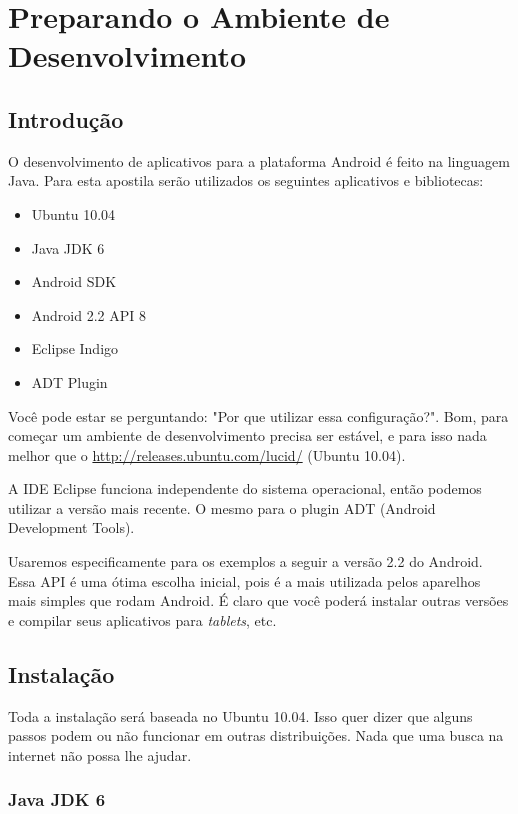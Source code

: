 \chapter{Preparando o Ambiente de Desenvolvimento}

\section{Introdução}

O desenvolvimento de aplicativos para a plataforma Android é feito na linguagem Java.
Para esta apostila serão utilizados os seguintes aplicativos e bibliotecas:

\begin{itemize}
\item Ubuntu 10.04
\item Java JDK 6
\item Android SDK
\item Android 2.2 API 8
\item Eclipse Indigo
\item ADT Plugin
\end{itemize}

Você pode estar se perguntando: "Por que utilizar essa configuração?". Bom, para começar
um ambiente de desenvolvimento precisa ser estável, e para isso nada melhor que o
\url{http://releases.ubuntu.com/lucid/} (Ubuntu 10.04).

A IDE Eclipse funciona independente do sistema operacional, então podemos utilizar a versão
mais recente. O mesmo para o plugin ADT (Android Development Tools).

Usaremos especificamente para os exemplos a seguir a versão 2.2 do Android. Essa API é uma
ótima escolha inicial, pois é a mais utilizada pelos aparelhos mais simples que rodam Android.
É claro que você poderá instalar outras versões e compilar seus aplicativos para \textit{tablets}, etc.

\section{Instalação}

Toda a instalação será baseada no Ubuntu 10.04. Isso quer dizer que alguns passos podem ou não
funcionar em outras distribuições. Nada que uma busca na internet não possa lhe ajudar.

\subsection{Java JDK 6}


